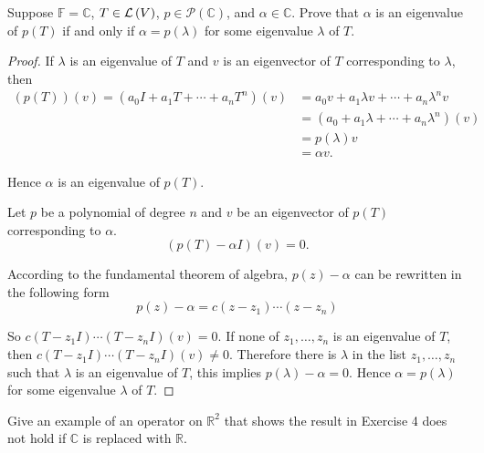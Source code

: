 \begin{exercise}\label{chapter5:sectionB:exercise4}
    Suppose $\mathbb{F} = \mathbb{C}$, $T\in\mathcal{L}\left({V}\right)$, $p\in\mathscr{P}(\mathbb{C})$, and $\alpha\in\mathbb{C}$. Prove that $\alpha$ is an eigenvalue of $p(T)$ if and only if $\alpha = p(\lambda)$ for some eigenvalue $\lambda$ of $T$.
\end{exercise}

\begin{proof}
    If $\lambda$ is an eigenvalue of $T$ and $v$ is an eigenvector of $T$ corresponding to $\lambda$, then
    \begin{align*}
        (p(T))(v) = (a_{0}I + a_{1}T + \cdots + a_{n}T^{n})(v) & = a_{0}v + a_{1}\lambda v + \cdots + a_{n}\lambda^{n}v  \\
                                                               & = (a_{0} + a_{1}\lambda + \cdots + a_{n}\lambda^{n})(v) \\
                                                               & = p(\lambda)v                                           \\
                                                               & = \alpha v.
    \end{align*}

    Hence $\alpha$ is an eigenvalue of $p(T)$.
    \bigskip

    Let $p$ be a polynomial of degree $n$ and $v$ be an eigenvector of $p(T)$ corresponding to $\alpha$.
    \[
        (p(T) - \alpha I)(v) = 0.
    \]

    According to the fundamental theorem of algebra, $p(z) - \alpha$ can be rewritten in the following form
    \[
        p(z) - \alpha = c(z - z_{1})\cdots (z - z_{n})
    \]

    So $c(T - z_{1}I)\cdots (T - z_{n}I)(v) = 0$. If none of $z_{1}, \ldots, z_{n}$ is an eigenvalue of $T$, then $c(T - z_{1}I)\cdots (T - z_{n}I)(v) \ne 0$. Therefore there is $\lambda$ in the list $z_{1}, \ldots, z_{n}$ such that $\lambda$ is an eigenvalue of $T$, this implies $p(\lambda) - \alpha = 0$. Hence $\alpha = p(\lambda)$ for some eigenvalue $\lambda$ of $T$.
\end{proof}
\newpage

\begin{exercise}
    Give an example of an operator on $\mathbb{R}^{2}$ that shows the result in Exercise 4 does not hold if $\mathbb{C}$ is replaced with $\mathbb{R}$.
\end{exercise}

